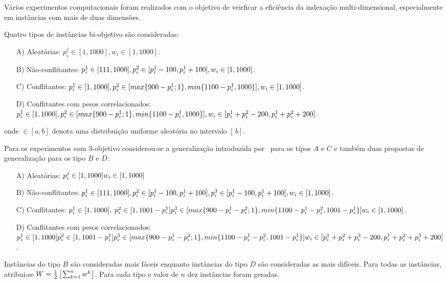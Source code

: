 Vários experimentos computacionais foram realizados com o objetivo de veirficar
a eficiência da indexação multi-dimensional, especialmente em instâncias com
mais de duas dimensões.


Quatro tipos de instâncias bi-objetivo são consideradas:
\begin{enumerate}
  \item[A)] Aleatórias: $
    p^j_i \in [1, 1000],
    w_i \in [1,1000]$.
  \item[B)] Não-conflitantes: $
    p^1_i \in [111, 1000],\\
    p^2_i \in [p^1_i - 100, p^1_i + 100],\\
    w_i \in [1,1000]$.
  \item[C)] Conflitantes: $
    p^1_i \in [1, 1000],\\
    p^2_i \in [max\{900-p^1_i;1\}, min\{1100-p^1_i, 1000\}],\\
    w_i \in [1,1000]$.
  \item[D)] Conflitantes com pesos correlacionados: $
    p^1_i \in [1, 1000],\\
    p^2_i \in [max\{900-p^1_i;1\}, min\{1100-p^1_i, 1000\}],\\
    w_i \in [p^1_i+p^2_i-200, p^1_i+p^2_i+200]$.
\end{enumerate}
onde $\in [a,b]$ denota uma distribuição uniforme aleatória no intervalo
$[\,b]$.

Para os experimentos com $3$-objetivo considerou-se
a generalização introduzida por~\cite{bazgan2009}
para os tipos $A$ e $C$ e também duas propostas de generalização
para os tipo $B$ e $D$:
\begin{enumerate}
  \item[A)] Aleatórias: $
    p^j_i \in [1, 1000]\\
    w_i \in [1,1000]$
  \item[B)] Não-conflitantes: $
    p^1_i \in [111, 1000],\\
    p^2_i \in [p^1_i - 100, p^1_i + 100],\\
    p^3_i \in [p^1_i - 100, p^1_i + 100],\\
    w_i \in [1,1000]$.
  \item[C)] Conflitantes: $
    p^1_i \in [1, 1000], \;
    p^2_i \in [1, 1001 - p^1_i] \\
    p^3_i \in [max\{900-p^1_i-p^2_i;1\}, min\{1100-p^1_i-p^2_i, 1001-p^1_i\}]\\
    w_i \in [1,1000]$.
  \item[D)] Conflitantes com pesos correlacionados: $
    p^1_i \in [1, 1000]\\
    p^2_i \in [1, 1001 - p^1_i] \\
    p^3_i \in [max\{900-p^1_i-p^2_i;1\}, min\{1100-p^1_i-p^2_i, 1001-p^1_i\}]\\
    w_i \in [p^1_i+p^2_i+p^3_i-200, p^1_i+p^2_i+p^3_i+200]$.
\end{enumerate}
Instâncias do tipo $B$ são consideradas mais fáceis enquanto instâncias do
tipo $D$ são consideradas as mais difíceis.
Para todas as instâncias, atribui-se $W=\frac{1}{2}\left \lfloor{\sum^n_{k=1} w^k}\right \rfloor$.
Para cada tipo e valor de $n$ dez instâncias foram geradas.
